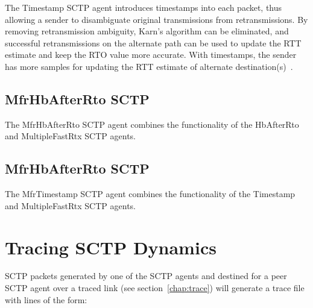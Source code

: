 	 The Timestamp SCTP agent introduces timestamps into each packet,
	 thus allowing a sender to disambiguate original transmissions
	 from retransmissions. By removing retransmission ambiguity,
	 Karn's algorithm can be eliminated, and successful
	 retransmissions on the alternate path can be used to update the
	 RTT estimate and keep the RTO value more accurate. With
	 timestamps, the sender has more samples for updating the RTT
	 estimate of alternate destination(s)~\cite{SCTP_CARO_2003e}.

      \subsection{MfrHbAfterRto SCTP}

         The MfrHbAfterRto SCTP agent combines the functionality of the
         HbAfterRto and MultipleFastRtx SCTP agents.


      \subsection{MfrHbAfterRto SCTP}

         The MfrTimestamp SCTP agent combines the functionality of the
         Timestamp and MultipleFastRtx SCTP agents.

   \section{Tracing SCTP Dynamics}
   \label{sec:sctpTracing}

      SCTP packets generated by one of the SCTP agents and destined for a
      peer SCTP agent over a traced link (see section~\ref{chap:trace})
      will generate a trace file with lines of the form:

